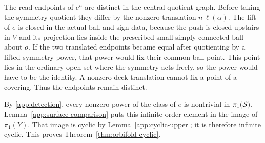 The read endpoints of $e^n$ are distinct in the central quotient
graph.  Before taking the symmetry quotient they differ by the
nonzero translation $n\,\ell(\alpha)$.  The lift of $e$ is closed in
the actual ball and sign data, because the push is closed upstairs in $V$ and its projection lies
inside the prescribed small simply connected ball about $o$.  If the two translated endpoints became
equal after quotienting by a lifted symmetry power, that power would
fix their common ball point.  This point lies in the ordinary open
set where the symmetry acts freely, so the power would have to be
the identity.  A nonzero deck translation cannot fix a point of a
covering.  Thus the endpoints remain distinct.

By \eqref{app:detection}, every nonzero power of the class of $e$ is
nontrivial in $\pi_1(\mathcal S)$.  Lemma~\ref{app:surface-comparison} puts
this infinite-order element in the image of $\pi_1(Y)$.  That image
is cyclic by Lemma~\ref{app:cyclic-upper}; it is therefore infinite
cyclic.  This proves Theorem~\ref{thm:orbifold-cyclic}.
